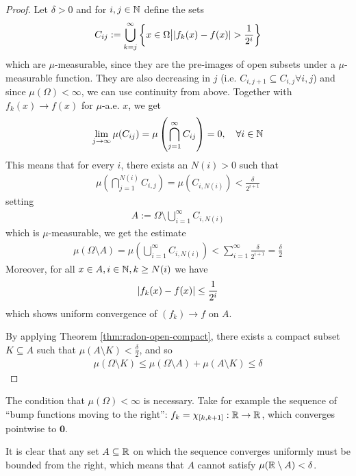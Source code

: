 \begin{proof}
Let $\delta > 0$ and for $i,j \in \mathbb{N}$ define the sets
\begin{align*}
  C_{ij} := \bigcup_{k=j}^{\infty} \left\{x \in \Omega \big\vert \vert f_k(x) - f(x)\vert > \frac{1}{2^{i}}\right\}
\end{align*}
which are $\mu$-measurable, since they are the pre-images of open subsets under a $\mu$-measurable function.
They are also decreasing in $j$ (i.e. $C_{i,j + 1} \subseteq C_{i,j} \forall i,j$) and since $\mu(\Omega) < \infty$,
we can use continuity from above. 
Together with $f_k(x) \to f(x)$ for $\mu$-a.e. $x$, we get
\begin{align*}
  \lim_{j \to \infty} \mu(C_{ij}) = \mu\left(
    \bigcap_{j=1}^{\infty}C_{ij}
  \right)
  = 0, \quad \forall i \in \mathbb{N}
\end{align*}
This means that for every $i$, there exists an $N(i) > 0$ such that
\begin{align*}
  \mu\left(
    \bigcap_{j=1}^{N(i)}C_{i,j}
  \right)
  =
  \mu(C_{i,N(i)})  < \frac{\delta}{2^{i+1}}
\end{align*}
setting
\begin{align*}
  A := \Omega \setminus \bigcup_{i=1}^{\infty}C_{i,N(i)}
\end{align*}
which is $\mu$-measurable, we get the estimate
\begin{align*}
  \mu(\Omega \setminus A) = \mu \left(
    \bigcup_{i=1}^{\infty}C_{i,N(i)} 
  \right)
    < \sum_{i=1}^{\infty} \frac{\delta}{2^{i+1}} = \frac{\delta}{2}
\end{align*}
Moreover, for all $x \in A, i \in \mathbb{N}, k \geq N(i)$ we have
\begin{align*}
  \vert f_k(x) - f(x)\vert \leq \frac{1}{2^{i}}
\end{align*}
which shows uniform convergence of $(f_k) \to f$ on $A$.

By applying Theorem \ref{thm:radon-open-compact}, there exists a compact subset $K \subseteq A$ such that $\mu(A \setminus K) < \frac{\delta}{2}$, and so
\begin{align*}
  \mu(\Omega \setminus K) \leq \mu(\Omega \setminus A) + \mu(A \setminus K) \leq \delta
\end{align*}
\end{proof}

\begin{rem}[]
  The condition that $\mu(\Omega) < \infty$ is necessary.
Take for example the sequence of ``bump functions moving to the right'':
$f_k = \chi_{[k,k+1]}:\mathbb{R} \to \mathbb{R}$, which converges pointwise to $\bm{0}$.

It is clear that any set $A \subseteq \mathbb{R}$ on which the sequence converges uniformly must be bounded from the right, which means that $A$ cannot satisfy $\mu(\mathbb{R} \setminus A) < \delta$.
\end{rem}


